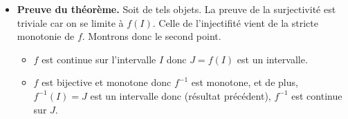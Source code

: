\documentclass{article}
\begin{document}
\begin{question_kholle}
\begin{itemize}[label=$\vartriangleright$]
\begin{itemize}[label=$\star$]
\begin{itemize}
				            \item si $x\in I$ vérifie $x\geq x_{0}$, alors $f(x)\geq f(x_{0})>y_{0}$
			            \end{itemize}
			            par conséquent, $y_{0}\notin f(I)$.\\
			            Ainsi, $\ell_{g}=f(x_{0})$ et on montre de même que $f(x_{0})=\ell_{d}$ si bien que nous pouvons conclure que $f$ est continue en $x_{0}$.\\
			      \item Supposons à présent que $x_{0}$ est un bord de $I$. Il suffit d’adapter la preuve ci-dessus en ne considérant que l’intervalle contenant $I$ à choisir entre $[x_{0},+\infty[$ et $]-\infty,x_{0}]$.
		      \end{itemize}

		\item \textbf{Preuve du théorème.} Soit de tels objets. La preuve de la surjectivité est triviale car on se limite à $f(I)$. Celle de l’injectifité vient de la stricte monotonie de $f$. Montrons donc le second point.
		      \begin{itemize}
			      \item $f$ est continue sur l’intervalle $I$ donc $J=f(I)$ est un intervalle.
			      \item $f$ est bijective et monotone donc $f^{-1}$ est monotone, et de plus, $f^{-1}(I)=J$ est un intervalle donc (résultat précédent), $f^{-1}$ est continue sur $J$.
		      \end{itemize}
	\end{itemize}
\end{question_kholle}
\end{document}
